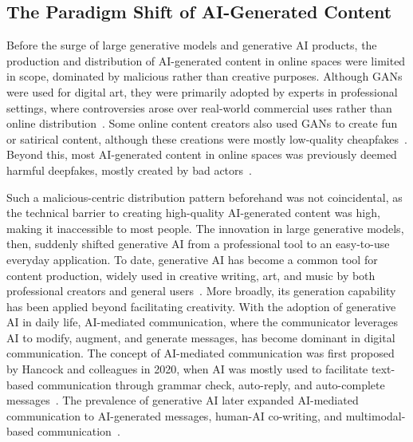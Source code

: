 \subsection{The Paradigm Shift of AI-Generated Content}
\label{subsec:shift}
Before the surge of large generative models and generative AI products, the production and distribution of AI-generated content in online spaces were limited in scope, dominated by malicious rather than creative purposes. Although GANs were used for digital art, they were primarily adopted by experts in professional settings, where controversies arose over real-world commercial uses rather than online distribution~\cite{epstein2020gets}. Some online content creators also used GANs to create fun or satirical content, although these creations were mostly low-quality cheapfakes~\cite{westerlund2019emergence}. Beyond this, most AI-generated content in online spaces was previously deemed harmful deepfakes, mostly created by bad actors~\cite{westerlund2019emergence, oxford2019deepfakes}. %

Such a malicious-centric distribution pattern beforehand was not coincidental, as the technical barrier to creating high-quality AI-generated content was high, making it inaccessible to most people. The innovation in large generative models, then, suddenly shifted generative AI from a professional tool to an easy-to-use everyday application. To date, generative AI has become a common tool for content production, widely used in creative writing, art, and music by both professional creators and general users~\cite{zhou2024generative, wan2024felt, deruty2022development}. More broadly, its generation capability has been applied beyond facilitating creativity. With the adoption of generative AI in daily life, AI-mediated communication, where the communicator leverages AI to modify, augment, and generate messages, has become dominant in digital communication. The concept of AI-mediated communication was first proposed by Hancock and colleagues in 2020, when AI was mostly used to facilitate text-based communication through grammar check, auto-reply, and auto-complete messages~\cite{hancock2020ai}. The prevalence of generative AI later expanded AI-mediated communication to AI-generated messages, human-AI co-writing, and multimodal-based communication~\cite{li2024value, fu2025should}.  

